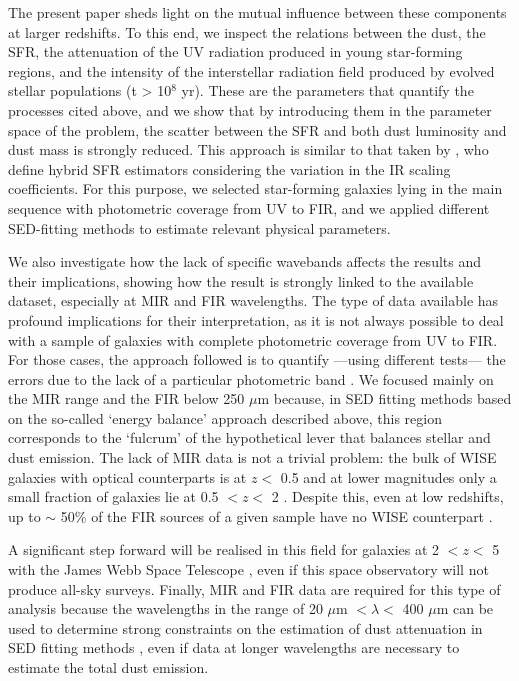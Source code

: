\documentclass{aa}
\begin{document}
The present paper sheds light on the mutual influence between these components at larger redshifts. To this end, we inspect the relations between the dust, the SFR, the attenuation of the UV radiation produced in young star-forming regions, and the intensity of the interstellar radiation field produced by evolved stellar populations (t > 10$^8$ yr). These are the parameters that quantify the processes cited above, and we show that by introducing them in the parameter space of the problem, the scatter between the SFR and both dust luminosity and dust mass is strongly reduced. This approach is similar to that taken by \cite{boq2}, who define hybrid SFR estimators considering the variation in the IR scaling coefficients. For this purpose, we selected star-forming galaxies lying in the main sequence with photometric coverage from UV to FIR, and we applied different SED-fitting methods to estimate relevant physical parameters. 

We also investigate how the lack of specific wavebands affects the results and their implications, showing how the result is strongly linked to the available dataset, especially at MIR and FIR wavelengths. The type of data available has profound implications for their interpretation, as it is not always possible to deal with a sample of galaxies with complete photometric coverage from UV to FIR. For those cases, the approach followed is to quantify ---using different tests--- the errors due to the lack of a particular photometric band \citep[e.g.][]{smi,cie,bua2}. We focused mainly on the MIR range and the FIR below 250 $\mu$m because, in SED fitting methods based on the so-called `energy balance' approach described above, this region corresponds to the `fulcrum' of the hypothetical lever that balances stellar and dust emission. The lack of MIR data is not a trivial problem: the bulk of WISE galaxies with optical counterparts is at $z <$ 0.5 and at lower magnitudes only a small fraction of galaxies lie at 0.5 $< z <$ 2 \citep[see Fig. 4 of][]{yan}. Despite this, even at low redshifts,  up to $\sim$ 50\% of the FIR sources of a given sample have no WISE counterpart \citep{bou}. 

A significant step forward will be realised in this field for galaxies at 2 $< z <$ 5 with the James Webb Space Telescope \citep[JWST,][]{gar}, even if this space observatory will not produce all-sky surveys. Finally, MIR and FIR data are required for this type of analysis because the wavelengths in the range of 20 $\mu$m $< \lambda <$ 400 $\mu$m can be used to determine strong constraints on the estimation of dust attenuation in SED fitting methods \citep{bua}, even if data at longer wavelengths are necessary to estimate the total dust emission.
\end{document}
